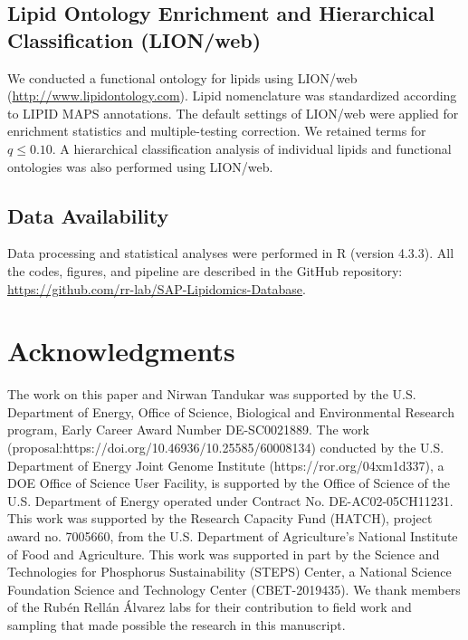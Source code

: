 \documentclass[9pt,twocolumn,twoside]{rilabRxiv}
\begin{document}
\subsection*{Lipid Ontology Enrichment and Hierarchical Classification (LION/web)}

We conducted a functional ontology for lipids using LION/web \citep{Molenaar2019} (\url{http://www.lipidontology.com}). Lipid nomenclature was standardized according to LIPID MAPS annotations. The default settings of LION/web were applied for enrichment statistics and multiple-testing correction. We retained terms for $q \leq 0.10$. A hierarchical classification analysis of individual lipids and functional ontologies was also performed using LION/web.

\subsection*{Data Availability}

Data processing and statistical analyses were performed in R (version 4.3.3). All the codes, figures, and pipeline are described in the GitHub repository: \url{https://github.com/rr-lab/SAP-Lipidomics-Database}.

\section{Acknowledgments}
The work on this paper and Nirwan Tandukar was supported by the U.S. Department of Energy, Office of Science, Biological and Environmental Research program, Early Career Award Number DE-SC0021889.
The work (proposal:https://doi.org/10.46936/10.25585/60008134) conducted by the U.S. Department of Energy Joint Genome Institute (https://ror.org/04xm1d337), a DOE Office of Science User Facility, is supported by the Office of Science of the U.S. Department of Energy operated under Contract No. DE-AC02-05CH11231. This work was supported by the Research Capacity Fund (HATCH), project award no. 7005660, from the U.S. Department of Agriculture’s National Institute of Food and Agriculture.  
This work was supported in part by the Science and Technologies for Phosphorus Sustainability (STEPS) Center, a National Science Foundation Science and Technology Center (CBET-2019435).
We thank members of the Rubén Rellán Álvarez labs for their contribution to field work and sampling that made possible the research in this manuscript.



\pagebreak
\end{document}
